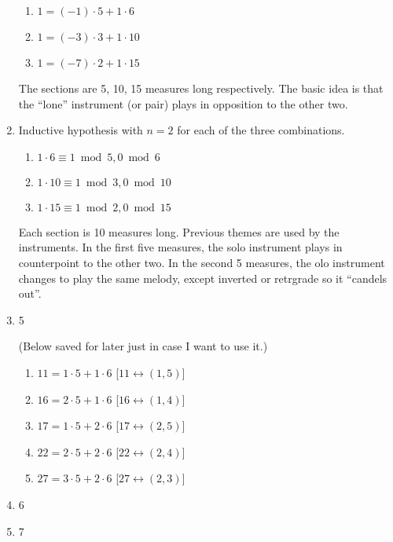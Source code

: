 \documentclass[12pt]{article}
\begin{document}
\begin{enumerate}
\begin{enumerate}
\item $1 = (-1)\cdot 5 + 1\cdot 6$
\item $1 = (-3)\cdot 3 + 1\cdot 10$
\item $1 = (-7)\cdot 2 + 1\cdot 15$
\end{enumerate}

The sections are 5, 10, 15 measures long respectively. The basic idea
is that the ``lone'' instrument (or pair) plays in opposition to the
other two.

\item Inductive hypothesis with $n=2$ for each of the three
  combinations.

\begin{enumerate}
\item $1\cdot 6 \equiv 1 \bmod 5, 0 \bmod 6$
\item $1\cdot 10 \equiv 1 \bmod 3, 0 \bmod 10$
\item $1\cdot 15 \equiv 1 \bmod 2, 0 \bmod 15$
\end{enumerate}

Each section is 10 measures long. Previous themes are used by the
instruments. In the first five measures, the solo instrument plays in
counterpoint to the other two. In the second 5 measures, the olo
instrument changes to play the same melody, except inverted or
retrgrade so it ``candels out''.

\item 5

(Below saved for later just in case I want to use it.)

\begin{enumerate}
\item $11 = 1\cdot 5 + 1\cdot 6$ [$11 \leftrightarrow (1,5)]$
\item $16 = 2\cdot 5 + 1\cdot 6$ [$16 \leftrightarrow (1,4)]$
\item $17 = 1\cdot 5 + 2\cdot 6$ [$17 \leftrightarrow (2,5)]$
\item $22 = 2\cdot 5 + 2\cdot 6$ [$22 \leftrightarrow (2,4)]$
\item $27 = 3\cdot 5 + 2\cdot 6$ [$27 \leftrightarrow (2,3)]$
\end{enumerate}

\item 6
\item 7

\end{enumerate}
\end{document}
